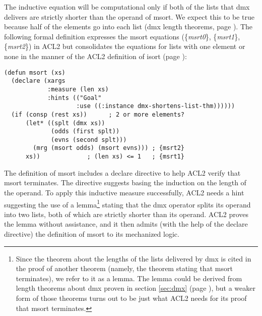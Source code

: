 The inductive equation will be computational only if
both of the lists that \textsf{dmx} delivers are strictly
shorter than the operand of \textsf{msort}.
We expect this to be true because half
of the elements go into each list
(\textsf{dmx} length theorems, page \pageref{thm:dmx-length-first-second}).
The following formal definition expresses the \textsf{msort}
equations (\{\emph{msrt0}\}, \{\emph{msrt1}\}, \{\emph{msrt2}\}) in ACL2
but consolidates the equations for lists with one element or none in the
manner of the ACL2 definition of \textsf{isort} (page \pageref{defun:isort}):

\label{defun:msort}\label{eq:msrt1}
\begin{code}
\begin{verbatim}
(defun msort (xs)
  (declare (xargs
            :measure (len xs)
            :hints (("Goal"
                    :use ((:instance dmx-shortens-list-thm))))))
  (if (consp (rest xs))      ; 2 or more elements?
      (let* ((splt (dmx xs))
             (odds (first splt))
             (evns (second splt)))
        (mrg (msort odds) (msort evns))) ; {msrt2}
      xs))             ; (len xs) <= 1   ; {msrt1}
\end{verbatim}
\end{code}

The definition of \textsf{msort} includes
a \textsf{declare} directive
to help ACL2 verify that \textsf{msort} terminates.
The directive suggests basing the induction on the length of the operand.
To apply this inductive measure successfully,
ACL2 needs a hint suggesting the use of a lemma\footnote{Since
the theorem about the lengths of the lists
delivered by \textsf{dmx} is cited in the proof of another theorem
(namely, the theorem stating that \textsf{msort} terminates),
we refer to it as a lemma.
The lemma could be derived from length theorems about \textsf{dmx}
proven in section \ref{sec:dmx} (page \pageref{thm:dmx-length-first-second}),
but a weaker form of those theorems turns out to be just what
ACL2 needs for its proof that \textsf{msort} terminates.}
stating that the \textsf{dmx} operator splits its
operand into two lists, both of which are strictly shorter than its operand.
ACL2 proves the lemma without assistance,
and it then admits (with the help of the \textsf{declare} directive)
the definition of \textsf{msort} to its mechanized logic.

